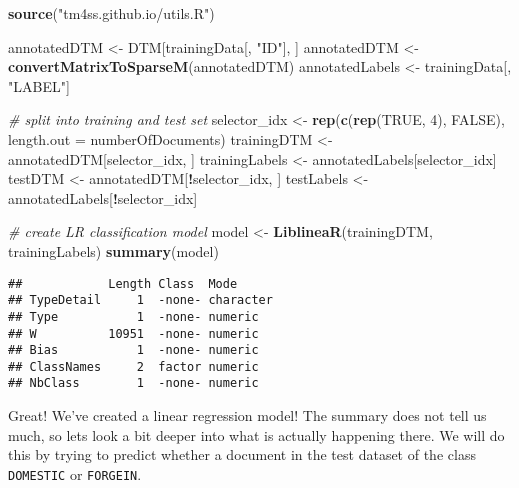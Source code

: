 \documentclass[
]{article}
\newenvironment{Shaded}{\begin{snugshade}}{\end{snugshade}}
\newcommand{\CommentTok}[1]{\textcolor[rgb]{0.56,0.35,0.01}{\textit{#1}}}
\newcommand{\DataTypeTok}[1]{\textcolor[rgb]{0.13,0.29,0.53}{#1}}
\newcommand{\DecValTok}[1]{\textcolor[rgb]{0.00,0.00,0.81}{#1}}
\newcommand{\KeywordTok}[1]{\textcolor[rgb]{0.13,0.29,0.53}{\textbf{#1}}}
\newcommand{\NormalTok}[1]{#1}
\newcommand{\OperatorTok}[1]{\textcolor[rgb]{0.81,0.36,0.00}{\textbf{#1}}}
\newcommand{\OtherTok}[1]{\textcolor[rgb]{0.56,0.35,0.01}{#1}}
\newcommand{\StringTok}[1]{\textcolor[rgb]{0.31,0.60,0.02}{#1}}
\begin{document}
\begin{Shaded}
\begin{Highlighting}[]
\KeywordTok{source}\NormalTok{(}\StringTok{"tm4ss.github.io/utils.R"}\NormalTok{)}

\NormalTok{annotatedDTM <-}\StringTok{ }\NormalTok{DTM[trainingData[, }\StringTok{"ID"}\NormalTok{], ]}
\NormalTok{annotatedDTM <-}\StringTok{ }\KeywordTok{convertMatrixToSparseM}\NormalTok{(annotatedDTM)}
\NormalTok{annotatedLabels <-}\StringTok{ }\NormalTok{trainingData[, }\StringTok{"LABEL"}\NormalTok{]}

\CommentTok{# split into training and test set}
\NormalTok{selector_idx <-}\StringTok{ }\KeywordTok{rep}\NormalTok{(}\KeywordTok{c}\NormalTok{(}\KeywordTok{rep}\NormalTok{(}\OtherTok{TRUE}\NormalTok{, }\DecValTok{4}\NormalTok{), }\OtherTok{FALSE}\NormalTok{), }\DataTypeTok{length.out =}\NormalTok{ numberOfDocuments)}
\NormalTok{trainingDTM <-}\StringTok{ }\NormalTok{annotatedDTM[selector_idx, ]}
\NormalTok{trainingLabels <-}\StringTok{ }\NormalTok{annotatedLabels[selector_idx]}
\NormalTok{testDTM <-}\StringTok{ }\NormalTok{annotatedDTM[}\OperatorTok{!}\NormalTok{selector_idx, ]}
\NormalTok{testLabels <-}\StringTok{ }\NormalTok{annotatedLabels[}\OperatorTok{!}\NormalTok{selector_idx]}

\CommentTok{# create LR classification model}
\NormalTok{model <-}\StringTok{ }\KeywordTok{LiblineaR}\NormalTok{(trainingDTM, trainingLabels)}
\KeywordTok{summary}\NormalTok{(model)}
\end{Highlighting}
\end{Shaded}

\begin{verbatim}
##            Length Class  Mode     
## TypeDetail     1  -none- character
## Type           1  -none- numeric  
## W          10951  -none- numeric  
## Bias           1  -none- numeric  
## ClassNames     2  factor numeric  
## NbClass        1  -none- numeric
\end{verbatim}

Great! We've created a linear regression model! The summary does not
tell us much, so lets look a bit deeper into what is actually happening
there. We will do this by trying to predict whether a document in the
test dataset of the class \texttt{DOMESTIC} or \texttt{FORGEIN}.

\begin{Shaded}
\end{Shaded}
\end{document}
